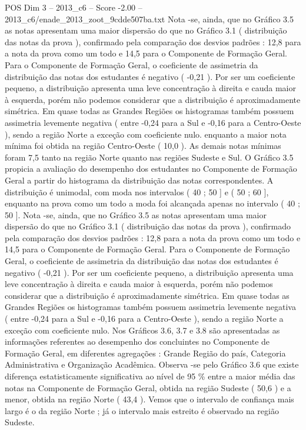 \begin{textsample}{POS Dim 3 – 2013\_c6 – Score -2.00 – 2013\_c6/enade\_2013\_zoot\_9cdde507ba.txt}
Nota -se, ainda, que no Gráfico 3.5 as notas apresentam uma maior dispersão do que no Gráfico 3.1 ( distribuição das notas da prova ), confirmado pela comparação dos desvios padrões : 12,8 para a nota da prova como um todo e 14,5 para o Componente de Formação Geral.
Para o Componente de Formação Geral, o coeficiente de assimetria da distribuição das notas dos estudantes é negativo ( -0,21 ).
Por ser um coeficiente pequeno, a distribuição apresenta uma leve concentração à direita e cauda maior à esquerda, porém não podemos considerar que a distribuição é aproximadamente simétrica.
Em quase todas as Grandes Regiões os histogramas também possuem assimetria levemente negativa ( entre -0,24 para a Sul e -0,16 para a Centro-Oeste ), sendo a região Norte a exceção com coeficiente nulo. enquanto a maior nota mínima foi obtida na região Centro-Oeste ( 10,0 ).
As demais notas mínimas foram 7,5 tanto na região Norte quanto nas regiões Sudeste e Sul.
O Gráfico 3.5 propicia a avaliação do desempenho dos estudantes no Componente de Formação Geral a partir do histograma da distribuição das notas correspondentes.
A distribuição é unimodal, com moda nos intervalos ( 40 ; 50 ] e ( 50 ; 60 ], enquanto na prova como um todo a moda foi alcançada apenas no intervalo ( 40 ; 50 ].
Nota -se, ainda, que no Gráfico 3.5 as notas apresentam uma maior dispersão do que no Gráfico 3.1 ( distribuição das notas da prova ), confirmado pela comparação dos desvios padrões : 12,8 para a nota da prova como um todo e 14,5 para o Componente de Formação Geral.
Para o Componente de Formação Geral, o coeficiente de assimetria da distribuição das notas dos estudantes é negativo ( -0,21 ).
Por ser um coeficiente pequeno, a distribuição apresenta uma leve concentração à direita e cauda maior à esquerda, porém não podemos considerar que a distribuição é aproximadamente simétrica.
Em quase todas as Grandes Regiões os histogramas também possuem assimetria levemente negativa ( entre -0,24 para a Sul e -0,16 para a Centro-Oeste ), sendo a região Norte a exceção com coeficiente nulo.
Nos Gráficos 3.6, 3.7 e 3.8 são apresentadas as informações referentes ao desempenho dos concluintes no Componente de Formação Geral, em diferentes agregações : Grande Região do país, Categoria Administrativa e Organização Acadêmica.
Observa -se pelo Gráfico 3.6 que existe diferença estatisticamente significativa ao nível de 95 \% entre a maior média das notas na Componente de Formação Geral, obtida na região Sudeste ( 50,6 ) e a menor, obtida na região Norte ( 43,4 ).
Vemos que o intervalo de confiança mais largo é o da região Norte ; já o intervalo mais estreito é observado na região Sudeste.

\end{textsample}
